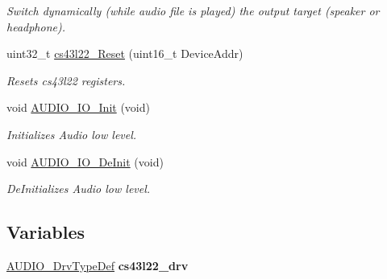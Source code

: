 \begin{DoxyCompactItemize}
\begin{DoxyCompactList}\small\item\em Switch dynamically (while audio file is played) the output target (speaker or headphone). \end{DoxyCompactList}\item 
uint32\+\_\+t \mbox{\hyperlink{group___c_s43_l22___exported___functions_ga647488feb466972a5557a2fe2e9350e7}{cs43l22\+\_\+\+Reset}} (uint16\+\_\+t Device\+Addr)
\begin{DoxyCompactList}\small\item\em Resets cs43l22 registers. \end{DoxyCompactList}\item 
\mbox{\label{group___c_s43_l22___exported___functions_gace44c34a627a0fb28c61366b9ca80b78}} 
void \mbox{\hyperlink{group___c_s43_l22___exported___functions_gace44c34a627a0fb28c61366b9ca80b78}{A\+U\+D\+I\+O\+\_\+\+I\+O\+\_\+\+Init}} (void)
\begin{DoxyCompactList}\small\item\em Initializes Audio low level. \end{DoxyCompactList}\item 
\mbox{\label{group___c_s43_l22___exported___functions_ga06ed3f7f32df17d8b5099754dd81d6b3}} 
void \mbox{\hyperlink{group___c_s43_l22___exported___functions_ga06ed3f7f32df17d8b5099754dd81d6b3}{A\+U\+D\+I\+O\+\_\+\+I\+O\+\_\+\+De\+Init}} (void)
\begin{DoxyCompactList}\small\item\em De\+Initializes Audio low level. \end{DoxyCompactList}\end{DoxyCompactItemize}
\subsection*{Variables}
\begin{DoxyCompactItemize}
\item 
\mbox{\label{group___c_s43_l22___exported___functions_gaeefb43f26352ff4df610fd8bca1b279d}} 
\mbox{\hyperlink{struct_a_u_d_i_o___drv_type_def}{A\+U\+D\+I\+O\+\_\+\+Drv\+Type\+Def}} {\bfseries cs43l22\+\_\+drv}
\end{DoxyCompactItemize}



